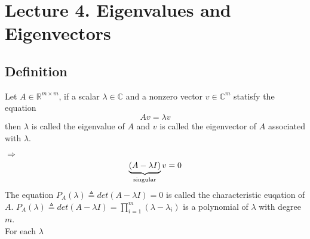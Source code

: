 \section{Lecture 4. Eigenvalues and Eigenvectors}
\begin{multicols}{2}
\subsection{Definition}
\begin{definition}
    Let $A\in\mathbb{R}^{m\times m}$, if a scalar $\lambda\in\mathbb{C}$ and a nonzero vector $v\in\mathbb{C}^m$ statisfy the equation 
    \[
        Av=\lambda v
    \]
    then $\lambda$ is called the eigenvalue of $A$ and $v$ is called the eigenvector of $A$ associated with $\lambda$.
\end{definition}
$\Longrightarrow$ 
\[
    \underbrace{(A-\lambda I)}_{\text{\rm singular}}v = 0
\]
The equation $P_A(\lambda)\triangleq det(A-\lambda I)=0$ is called the characteristic euqation of $A$. 
$P_A(\lambda)\triangleq det(A-\lambda I)=\prod_{i=1}^m(\lambda-\lambda_i)$ is a polynomial of $\lambda$ with degree $m$.\\

For each $\lambda$

\newpage
\end{multicols}